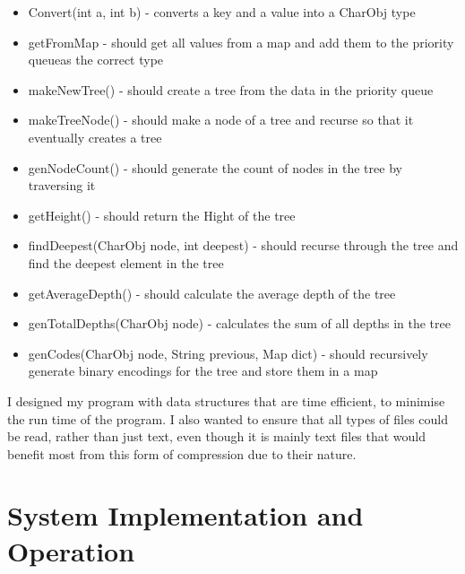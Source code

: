 \documentclass[11pt, oneside]{amsart}
\begin{document}
\begin{itemize}
\begin{itemize}
		\item Convert(int a, int b) - converts a key and a value into a CharObj type
		\item getFromMap - should get all values from a map and add them to the priority queueas the correct type
		\item makeNewTree() - should create a tree from the data in the priority queue
		\item makeTreeNode() - should make a node of a tree and recurse so that it eventually creates a tree
		\item genNodeCount() - should generate the count of nodes in the tree by traversing it
		\item getHeight() - should return the Hight of the tree
		\item findDeepest(CharObj node, int deepest) - should recurse through the tree and find the deepest element in the tree
		\item getAverageDepth() - should calculate the average depth of the tree
		\item genTotalDepths(CharObj node) - calculates the sum of all depths in the tree
		\item genCodes(CharObj node, String previous, Map dict) - should recursively generate binary encodings for the tree and store them in a map
	\end{itemize}
\end{itemize}
I designed my program with data structures that are time efficient, to minimise the run time of the program. I also wanted to ensure that all types of files could be read, rather than just text, even though it is mainly text files that would benefit most from this form of compression due to their nature. 
\section{System Implementation and Operation}
\end{document}
